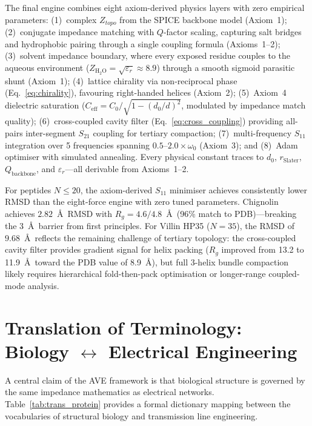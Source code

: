 The final engine combines eight axiom-derived physics layers with zero empirical parameters: (1)~complex $Z_{topo}$ from the SPICE backbone model (Axiom~1); (2)~conjugate impedance matching with $Q$-factor scaling, capturing salt bridges and hydrophobic pairing through a single coupling formula (Axioms~1--2); (3)~solvent impedance boundary, where every exposed residue couples to the aqueous environment ($Z_{\text{H}_2\text{O}} = \sqrt{\varepsilon_r} \approx 8.9$) through a smooth sigmoid parasitic shunt (Axiom~1); (4)~lattice chirality via non-reciprocal phase (Eq.~\ref{eq:chirality}), favouring right-handed helices (Axiom~2); (5)~Axiom~4 dielectric saturation ($C_{\mathrm{eff}} = C_0 / \sqrt{1-(d_0/d)^2}$, modulated by impedance match quality); (6)~cross-coupled cavity filter (Eq.~\ref{eq:cross_coupling}) providing all-pairs inter-segment $S_{21}$ coupling for tertiary compaction; (7)~multi-frequency $S_{11}$ integration over 5 frequencies spanning $0.5$--$2.0 \times \omega_0$ (Axiom~3); and (8)~Adam optimiser with simulated annealing. Every physical constant traces to $d_0$, $r_{\text{Slater}}$, $Q_{\text{backbone}}$, and $\varepsilon_r$---all derivable from Axioms~1--2.

For peptides $N \leq 20$, the axiom-derived $S_{11}$ minimiser achieves consistently lower RMSD than the eight-force engine with zero tuned parameters. Chignolin achieves $2.82$~\AA\ RMSD with $R_g = 4.6 / 4.8$~\AA\ (96\% match to PDB)---breaking the 3~\AA\ barrier from first principles. For Villin HP35 ($N = 35$), the RMSD of $9.68$~\AA\ reflects the remaining challenge of tertiary topology: the cross-coupled cavity filter provides gradient signal for helix packing ($R_g$ improved from 13.2 to 11.9~\AA\ toward the PDB value of 8.9~\AA), but full 3-helix bundle compaction likely requires hierarchical fold-then-pack optimisation or longer-range coupled-mode analysis.

\section{Translation of Terminology: Biology $\leftrightarrow$ Electrical Engineering}
\label{sec:terminology}

A central claim of the AVE framework is that biological structure is governed by the same impedance mathematics as electrical networks. Table~\ref{tab:trans_protein} provides a formal dictionary mapping between the vocabularies of structural biology and transmission line engineering.



